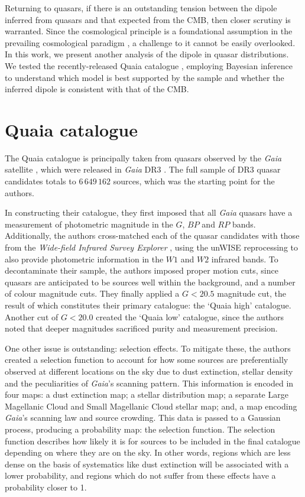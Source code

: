 \documentclass[fleqn,usenatbib]{mnras}
\begin{document}
    Returning to quasars, if there is an outstanding tension between the dipole inferred from quasars and that expected from the CMB, then closer scrutiny is warranted.
    Since the cosmological principle is a foundational assumption in the prevailing cosmological paradigm \citep{harrison2000}, a challenge to it cannot be easily overlooked.
    In this work, we present another analysis of the dipole in quasar distributions.
    We tested the recently-released Quaia catalogue \citep{storeyfisher2023quaia}, employing Bayesian inference to understand which model is best supported by the sample and whether the inferred dipole is consistent with that of the CMB.

\section{Quaia catalogue}
    \label{sec:quaia-catalogue}
    The Quaia catalogue \citep{storeyfisher2023quaia} is principally taken from quasars observed by the \textit{Gaia} satellite \citep{gaia2016}, which were released in \textit{Gaia} DR3 \citep{gaia2023b,gaia2023a}.
    The full sample of DR3 quasar candidates totals to $6\,649\,162$ sources, which was the starting point for the authors.
    
    In constructing their catalogue, they first imposed that all \textit{Gaia} quasars have a measurement of photometric magnitude in the $G$, $BP$ and $RP$ bands.
    Additionally, the authors cross-matched each of the quasar candidates with those from the \textit{Wide-field Infrared Survey Explorer} \citep[\textit{WISE};][]{wright2020}, using the unWISE reprocessing to also provide photometric information in the $W1$ and $W2$ infrared bands.
    To decontaminate their sample, the authors imposed proper motion cuts, since quasars are anticipated to be sources well within the background, and a number of colour magnitude cuts.
    They finally applied a $G < 20.5$ magnitude cut, the result of which constitutes their primary catalogue: the `Quaia high' catalogue.
    Another cut of $G < 20.0$ created the `Quaia low' catalogue, since the authors noted that deeper magnitudes sacrificed purity and measurement precision.
    
    One other issue is outstanding: selection effects.
    To mitigate these, the authors created a selection function to account for how some sources are preferentially observed at different locations on the sky due to dust extinction, stellar density and the peculiarities of \textit{Gaia}'s scanning pattern.
    This information is encoded in four maps: a dust extinction map; a stellar distribution map; a separate Large Magellanic Cloud and Small Magellanic Cloud stellar map; and, a map encoding \textit{Gaia}'s scanning law and source crowding.
    This data is passed to a Gaussian process, producing a probability map: the selection function.
    The selection function describes how likely it is for sources to be included in the final catalogue depending on where they are on the sky.
    In other words, regions which are less dense on the basis of systematics like dust extinction will be associated with a lower probability, and regions which do not suffer from these effects have a probability closer to 1.
    
\end{document}
